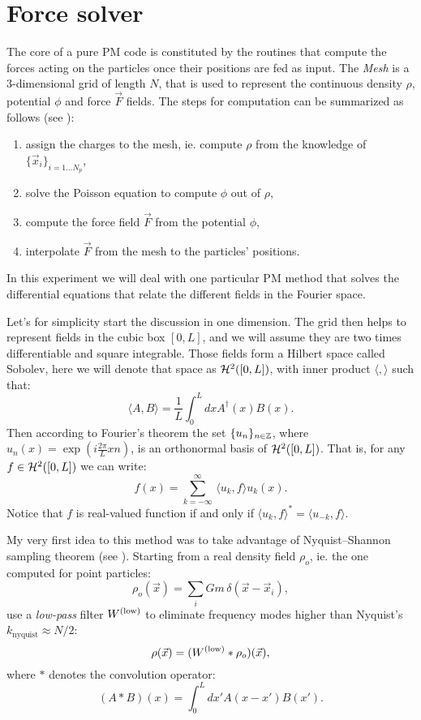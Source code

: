 \section{Force solver}

\noindent The core of a pure PM code is constituted
by the routines that compute the forces acting on the particles
once their positions are fed as input.
The \emph{Mesh} is a 3-dimensional grid of length $N$,
that is used to represent the continuous density $\rho$,
potential $\phi$ and force $\vec F$ fields.
The steps for computation can be summarized as follows (see \cite{hockney}):
\begin{enumerate}
    \item assign the charges to the mesh, ie. compute $\rho$
    from the knowledge of $\{ \vec x_i \}_{i=1\ldots N_p}$,
    \item solve the Poisson equation to compute $\phi$
    out of $\rho$,
    \item compute the force field $\vec F$ 
    from the potential $\phi$,
    \item interpolate $\vec F$ from the mesh to the particles'
    positions.
\end{enumerate}
In this experiment we will deal with one particular
PM method that solves the differential equations that
relate the different fields in the Fourier space.

Let's for simplicity start the discussion
in one dimension.
The grid then helps to represent fields in 
the cubic box $[0,L]$,
and we will assume they are two times differentiable
and square integrable.
Those fields form a Hilbert space called Sobolev,
here we will denote that space as $\mathcal{H}^2([0,L])$,
with inner product $\langle,\rangle$ such that:
\begin{equation}
    \langle A,B \rangle = \frac{1 }{ L} \int_{0}^L dx A^{\dagger}(x) B(x).
\end{equation}
Then according to Fourier's theorem the set $\{ u_n \}_{n\in \mathbb{Z}}$,
where $u_n(x) = \exp(i\frac{2 \pi}{ L} x n)$, is an orthonormal
basis of $\mathcal{H}^2([0,L])$.
That is, for any $f \in\mathcal{H}^2([0,L])$ we can write:
\begin{equation}
    f(x) = \sum_{k=-\infty}^{\infty}\, \langle u_k, f \rangle u_k(x).
\end{equation}
Notice that $f$ is real-valued function if and only if
$\langle u_k, f\rangle^* = \langle u_{-k},f \rangle$.

My very first idea to this method was to take advantage
of Nyquist--Shannon sampling theorem (see \cite{nyquist}).
Starting from a real density field $\rho_o$, ie. the one
computed for point particles:
\begin{equation}
    \rho_o(\vec x) = \sum_{i} G m\, \delta(\vec x - \vec x_i),
    \label{eq:rhoo}
\end{equation}
use a \emph{low-pass} filter $W^\mathrm{(low)}$ to eliminate frequency
modes higher than Nyquist's $k_{\mathrm{nyquist}} \approx N/2$:
\begin{equation}
    \rho(\vec x) = (W^\mathrm{(low)}*\rho_o)(\vec x),
\end{equation}
where $*$ denotes the convolution operator:
\begin{equation}
    (A*B)(x) = \int_0^L dx' A(x-x') B(x').
\end{equation}


